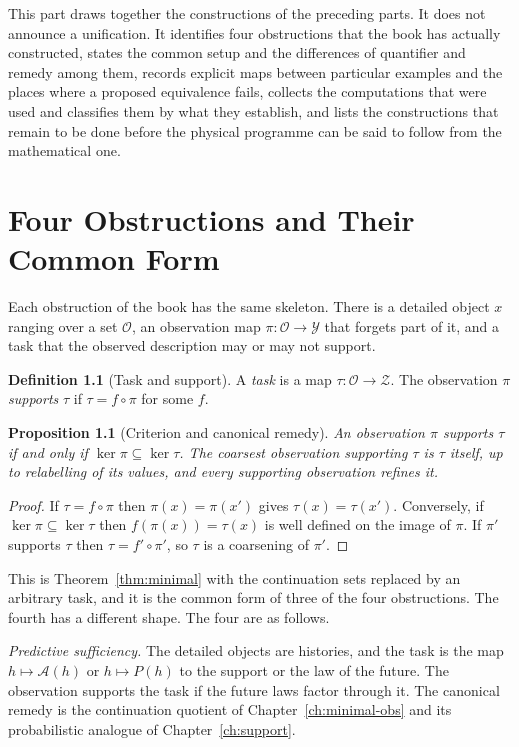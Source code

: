 \documentclass[11pt,oneside]{book}
\newtheorem{proposition}[theorem]{Proposition}
\theoremstyle{definition}
\newtheorem{definition}[theorem]{Definition}
\theoremstyle{remark}
\newcommand{\Adm}{\mathcal{A}}
\begin{document}
This part draws together the constructions of the preceding parts. It does not announce a unification. It identifies four obstructions that the book has actually constructed, states the common setup and the differences of quantifier and remedy among them, records explicit maps between particular examples and the places where a proposed equivalence fails, collects the computations that were used and classifies them by what they establish, and lists the constructions that remain to be done before the physical programme can be said to follow from the mathematical one.

\chapter{Four Obstructions and Their Common Form}\label{ch:four}

Each obstruction of the book has the same skeleton. There is a detailed object $x$ ranging over a set $\mathcal O$, an observation map $\pi\colon\mathcal O\to\mathcal Y$ that forgets part of it, and a task that the observed description may or may not support.

\begin{definition}[Task and support]
A \emph{task} is a map $\tau\colon\mathcal O\to\mathcal Z$. The observation $\pi$ \emph{supports} $\tau$ if $\tau=f\circ\pi$ for some $f$.
\end{definition}

\begin{proposition}[Criterion and canonical remedy]\label{prop:support}
An observation $\pi$ supports $\tau$ if and only if $\ker\pi\subseteq\ker\tau$. The coarsest observation supporting $\tau$ is $\tau$ itself, up to relabelling of its values, and every supporting observation refines it.
\end{proposition}

\begin{proof}
If $\tau=f\circ\pi$ then $\pi(x)=\pi(x')$ gives $\tau(x)=\tau(x')$. Conversely, if $\ker\pi\subseteq\ker\tau$ then $f(\pi(x))=\tau(x)$ is well defined on the image of $\pi$. If $\pi'$ supports $\tau$ then $\tau=f'\circ\pi'$, so $\tau$ is a coarsening of $\pi'$.
\end{proof}

This is Theorem~\ref{thm:minimal} with the continuation sets replaced by an arbitrary task, and it is the common form of three of the four obstructions. The fourth has a different shape. The four are as follows.

\emph{Predictive sufficiency.} The detailed objects are histories, and the task is the map $h\mapsto\Adm(h)$ or $h\mapsto P(h)$ to the support or the law of the future. The observation supports the task if the future laws factor through it. The canonical remedy is the continuation quotient of Chapter~\ref{ch:minimal-obs} and its probabilistic analogue of Chapter~\ref{ch:support}.
\end{document}
